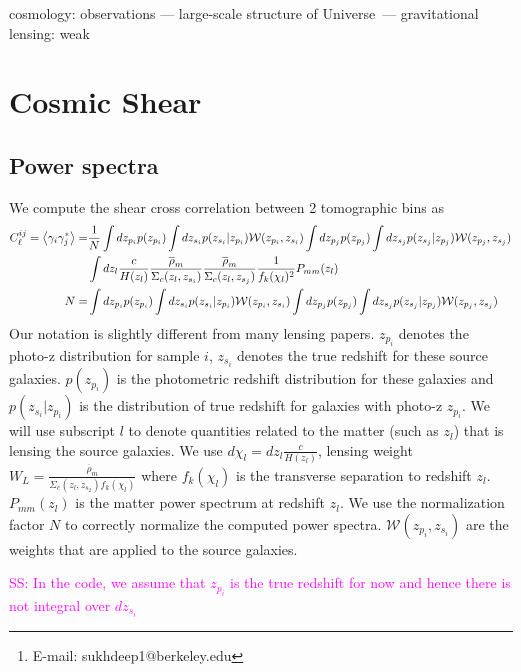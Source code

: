 \documentclass[a4paper,fleqn,usenatbib]{mnras}
\title[]{}
\author[S.~Singh et al.]{
   Sukhdeep Singh$^{1,2}$\thanks{E-mail: sukhdeep1@berkeley.edu},
\\
   $^{1}$ Berkeley Center for Cosmological Physics, Department of Physics, University of California, Berkeley, CA 94720, USA\\
   $^{2}$Lawrence Berkeley National Laboratory (LBNL),
Physics Division, Berkeley, CA 94720-8153, USA\\
}
\date{Accepted XXX. Received YYY; in original form ZZZ}
\newcommand{\sukhdeep}[1]{{\textcolor{magenta}{SS: #1}}}%
\begin{document}
\label{firstpage}
\pagerange{\pageref{firstpage}--\pageref{lastpage}}
\maketitle

\begin{abstract}
\end{abstract}

\begin{keywords}
cosmology: observations
  --- large-scale structure of Universe\ --- gravitational
  lensing: weak
\end{keywords}

\onecolumn
\section{Cosmic Shear}
	\subsection{Power spectra}
	We compute the shear cross correlation between 2 tomographic bins as
	\begin{align}
		C_{\ell}^{ij}=\left\langle \gamma_i\gamma_j^* \right\rangle=&\frac{1}{N}\int dz_{p_i} p(z_{p_i}) \int dz_{s_i} p(z_{s_i}|z_{p_i})\mathcal W(z_{p_i},z_{s_i})
		\int dz_{p_j} p(z_{p_j})\int dz_{s_j} p(z_{s_j}|z_{p_j})\mathcal W(z_{p_j},z_{s_j})\nonumber\\
		&\int dz_l \frac{c}{H(z_l)}\frac{\overline{\rho}_m}{\Sigma_c(z_l,z_{s_i})}\frac{\overline{\rho}_m}{\Sigma_c(z_l,z_{s_j})}
		\frac{1}{f_k(\chi_l)^2}P_{mm}(z_l)\\
		N=&\int dz_{p_i} p(z_{p_i})\int dz_{s_i} p(z_{s_i}|z_{p_i})\mathcal W(z_{p_i},z_{s_i})\int dz_{p_j} p(z_{p_j})\int dz_{s_j} p(z_{s_j}|z_{p_j})
			\mathcal W(z_{p_j},z_{s_j})
	\end{align}
	Our notation is slightly different from many lensing papers. $z_{p_i}$ denotes the photo-z distribution for sample $i$, $z_{s_i}$ denotes the true 
	redshift for these source galaxies. $p(z_{p_i})$ is the photometric redshift distribution for these galaxies and $p(z_{s_i}|z_{p_i})$ is the 
	distribution of true redshift for galaxies with photo-z $z_{p_i}$.
	We will use subscript $l$ to denote quantities related to the matter (such as $z_l$) that is lensing the 
	source galaxies. We use 
	$d\chi_l=dz_l \frac{c}{H(z_l)}$, lensing weight $W_L=\frac{\overline{\rho}_m}{\Sigma_c(z_l,z_{s_2})f_k(\chi_l)}$ where $f_k(\chi_l)$ is the transverse 
	separation to redshift $z_l$. $P_{mm}(z_l)$ is the matter power spectrum at redshift $z_l$. We use the normalization factor $N$ to correctly normalize 
	the computed power spectra. 
	$\mathcal W(z_{p_i},z_{s_i})$ are the weights that are applied to the source galaxies.
	
	\sukhdeep{In the code, we assume that $z_{p_i}$ is the true redshift for now and hence there is not integral over $dz_{s_i}$}
\end{document}
